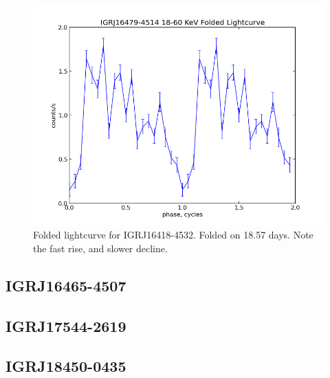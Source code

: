 \begin{figure}[h!]
\centering
\includegraphics[width=130mm]{gfx/Fig19.png}
\caption{Folded lightcurve for IGRJ16418-4532. Folded on 18.57 days. Note the fast rise, and slower decline.}
\label{Figure 19}
\end{figure} 

\subsection{IGRJ16465-4507}


\subsection{IGRJ17544-2619}


\subsection{IGRJ18450-0435}

